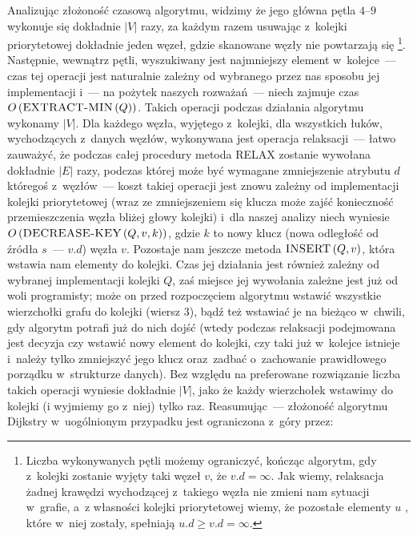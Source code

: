 Analizując złożoność czasową algorytmu, widzimy że jego główna pętla $4$--$9$ wykonuje się dokładnie $ \left| V \right| $ razy, za każdym razem usuwając z~kolejki priorytetowej dokładnie jeden węzeł, gdzie skanowane węzły nie powtarzają się \footnote{Liczba wykonywanych pętli możemy ograniczyć, kończąc algorytm, gdy z~kolejki zostanie wyjęty taki węzeł $v$, że $v.d = \infty$. Jak wiemy, relaksacja żadnej krawędzi wychodzącej z~takiego węzła nie zmieni nam sytuacji w~grafie, a~z własności kolejki priorytetowej wiemy, że pozostałe elementy $u$ , które w~niej zostały, spełniają $u.d \geqslant v.d = \infty$.}. Następnie, wewnątrz pętli, wyszukiwany jest najmniejszy element w~kolejce~--- czas tej operacji jest naturalnie zależny od wybranego przez nas sposobu jej implementacji i~--- na pożytek naszych rozważań~--- niech zajmuje czas $O \left( \textrm{\textsc{EXTRACT-MIN}} \left( Q \right) \right)$. Takich operacji podczas działania algorytmu wykonamy $ \left| V \right| $. Dla każdego węzła, wyjętego z~kolejki, dla wszystkich łuków, wychodzących z~danych węzłów, wykonywana jest operacja relaksacji~--- łatwo zauważyć, że podczas całej procedury metoda \textsc{RELAX} zostanie wywołana dokładnie $ \left| E \right|$ razy, podczas której może być wymagane zmniejszenie atrybutu $d$ któregoś z~węzłów~--- koszt takiej operacji jest znowu zależny od implementacji kolejki priorytetowej (wraz ze zmniejszeniem się klucza może zajść konieczność przemieszczenia węzła bliżej głowy kolejki) i~dla naszej analizy niech wyniesie $O \left( \textrm{\textsc{DECREASE-KEY}} \left( Q, v, k \right) \right)$, gdzie $k$ to nowy klucz (nowa odległość od źródła $s$~--- $v.d$) węzła $v$. Pozostaje nam jeszcze metoda $\textrm{\textsc{INSERT}} \left( Q, v \right)$, która wstawia nam elementy do kolejki. Czas jej działania jest również zależny od wybranej implementacji kolejki $Q$, zaś miejsce jej wywołania zależne jest już od woli programisty; może on przed rozpoczęciem algorytmu wstawić wszystkie wierzchołki grafu do kolejki (wiersz $3$), bądź też wstawiać je na bieżąco w~chwili, gdy algorytm potrafi już do nich dojść (wtedy podczas relaksacji podejmowana jest decyzja czy wstawić nowy element do kolejki, czy taki już w~kolejce istnieje i~należy tylko zmniejszyć jego klucz oraz~zadbać o~zachowanie prawidłowego porządku w~strukturze danych). Bez względu na preferowane rozwiązanie liczba takich operacji wyniesie dokładnie $ \left| V \right|$, jako że każdy wierzchołek wstawimy do kolejki (i wyjmiemy go z~niej) tylko raz. Reasumując~--- złożoność algorytmu Dijkstry w~uogólnionym przypadku jest ograniczona z~góry przez:

